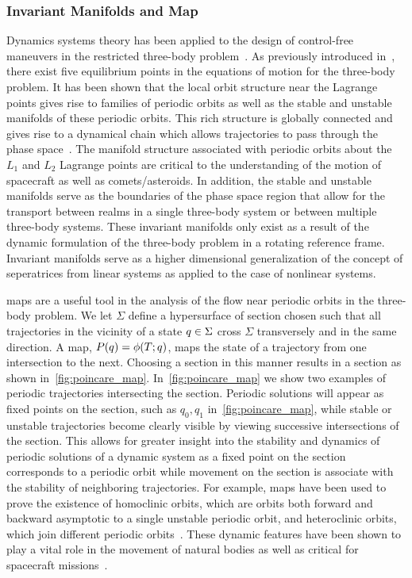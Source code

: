 \subsubsection{Invariant Manifolds and \Poincare Map}\label{sec:invariant_manifold}
Dynamics systems theory has been applied to the design of control-free maneuvers in the restricted three-body problem~\cite{koon2011}.
As previously introduced in~, there exist five equilibrium points in the equations of motion for the three-body problem.
It has been shown that the local orbit structure near the Lagrange points gives rise to families of periodic orbits as well as the stable and unstable manifolds of these periodic orbits.
This rich structure is globally connected and gives rise to a dynamical chain which allows trajectories to pass through the phase space~\cite{koon2011,conley1968}.
The manifold structure associated with periodic orbits about the \( L_1 \) and \( L_2 \) Lagrange points are critical to the understanding of the motion of spacecraft as well as comets/asteroids.
In addition, the stable and unstable manifolds serve as the boundaries of the phase space region that allow for the transport between realms in a single three-body system or between multiple three-body systems.
These invariant manifolds only exist as a result of the dynamic formulation of the three-body problem in a rotating reference frame. 
Invariant manifolds serve as a higher dimensional generalization of the concept of seperatrices from linear systems as applied to the case of nonlinear systems. 

\Poincare maps are a useful tool in the analysis of the flow near periodic orbits in the three-body problem.
We let \( \Sigma \) define a hypersurface of section chosen such that all trajectories in the vicinity of a state \( q \in \Sigma \) cross \( \Sigma \) transversely and in the same direction.
A \Poincare map, \( P(q) = \phi(T;q) \), maps the state of a trajectory from one intersection to the next.
Choosing a section in this manner results in a \Poincare section as shown in~\cref{fig:poincare_map}.
In~\cref{fig:poincare_map} we show two examples of periodic trajectories intersecting the \Poincare section. 
Periodic solutions will appear as fixed points on the section, such as \( q_0, q_1 \) in~\cref{fig:poincare_map}, while stable or unstable trajectories become clearly visible by viewing successive intersections of the section.
This allows for greater insight into the stability and dynamics of periodic solutions of a dynamic system as a fixed point on the \Poincare section corresponds to a periodic orbit while movement on the section is associate with the stability of neighboring trajectories. 
For example, \Poincare maps have been used to prove the existence of homoclinic orbits, which are orbits both forward and backward asymptotic to a single unstable periodic orbit, and heteroclinic orbits, which join different periodic orbits~\cite{conley1968,koon2000b}.
These dynamic features have been shown to play a vital role in the movement of natural bodies as well as critical for spacecraft missions~\cite{gomez2001,lo1997}.


